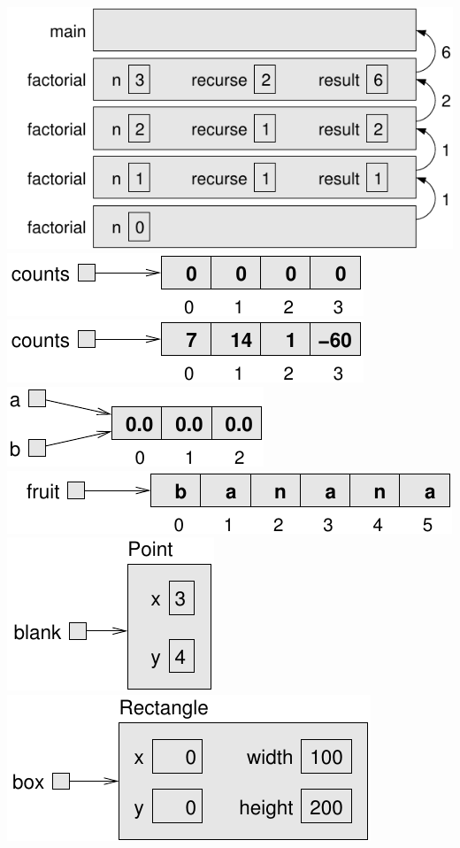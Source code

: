 \documentclass[12pt]{book}
\begin{document}
\clearpage%
\includegraphics{./figs/stack3.pdf}
\clearpage%
\includegraphics{./figs/array.pdf}
\clearpage%
\includegraphics{./figs/array2.pdf}
\clearpage%
\includegraphics{./figs/array3.pdf}
\clearpage%
\includegraphics{./figs/banana.pdf}
\clearpage%
\includegraphics{./figs/reference.pdf}
\clearpage%
\includegraphics{./figs/rectangle.pdf}
\end{document}
